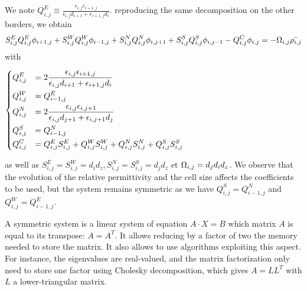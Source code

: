     We note $Q^E_{i,j} \equiv \frac{\epsilon_{i,j} \epsilon_{i+1,j}}{\epsilon_{i,j} d_{i+1} + \epsilon_{i+1,j} d_i}$.
    reproducing the same decomposition on the other borders, we obtain
    \begin{equation}
      \label{eq-descretPoisson1}
    S^E_{i,j} Q^E_{i,j} \phi_{i+1,j} + S^W_{i,j} Q^W_{i,j} \phi_{i-1,j} + S^N_{i,j} Q^N_{i,j} \phi_{i,j+1} + S^S_{i,j} Q^S_{i,j} \phi_{i,j-1} - Q^C_{i,j} \phi_{i,j} = - \Omega_{i,j} \bar{\rho_{i,j}}
    \end{equation}
    with
    \begin{center}
      $\begin{dcases}
     Q^E_{i,j} &= 2\frac{\epsilon_{i,j} \epsilon_{i+1,j}}{\epsilon_{i,j} d_{i+1} + \epsilon_{i+1,j} d_i} \\
     Q^W_{i,j} &= Q^E_{i-1,j} \\
     Q^N_{i,j} &= 2\frac{\epsilon_{i,j} \epsilon_{i,j+1}}{\epsilon_{i,j} d_{j+1} + \epsilon_{i,j+1} d_{j}}\\
     Q^S_{i,j} &= Q^N_{i-1,j} \\
     Q^C_{i,j} &= Q^E_{i,j}S^E_{i,j}+Q^W_{i,j}S^W_{i,j}+Q^N_{i,j}S^N_{i,j}+Q^S_{i,j}S^S_{i,j}
     \end{dcases}$
    \end{center}

    as well as $S^E_{i,j} = S^W_{i,j} =d_id_z, S^N_{i,j} = S^S_{i,j}= d_jd_z$ et $\Omega_{i,j} = d_jd_id_z$.
    We observe that the evolution of the relative permittivity and the cell size affects the coefficients to be used, but the system remains symmetric as we have $Q^S_{i,j} = Q^N_{i-1,j}$ and $ Q^W_{i,j} = Q^E_{i-1,j}$.
    
    A symmetric system is a linear system of equation $A \cdot X = B$  which matrix $A$ is equal to its transpose\string: $A = A^T$.
    It allows reducing by a factor of two the memory needed to store the matrix.
    It also allows to use algorithms exploiting this aspect.
    For instance, the eigenvalues are real-valued, and the matrix factorization only need to store one factor using Cholesky decomposition, which gives $A = L L^T$ with $L$ a lower-triangular matrix. 

